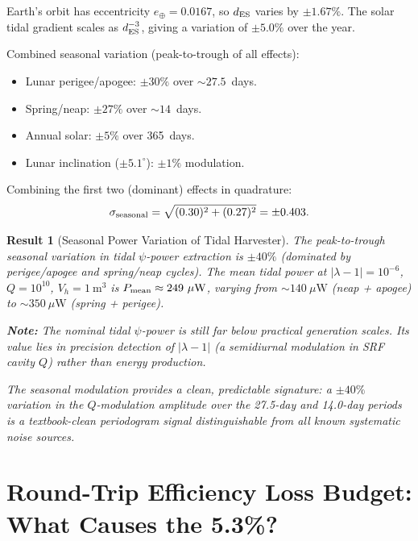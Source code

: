 \documentclass[aps,prd,twocolumn,superscriptaddress]{revtex4-2}
\newcommand{\lam}{|\lambda-1|}
\newtheorem{result}{Result}
\begin{document}
Earth's orbit has eccentricity $e_\oplus = 0.0167$, so $d_{\rm ES}$
varies by $\pm 1.67\%$.  The solar tidal gradient scales as
$d_{\rm ES}^{-3}$, giving a variation of $\pm 5.0\%$ over the year.

Combined seasonal variation (peak-to-trough of all effects):
\begin{itemize}
\item Lunar perigee/apogee: $\pm 30\%$ over $\sim 27.5$~days.
\item Spring/neap: $\pm 27\%$ over $\sim 14$~days.
\item Annual solar: $\pm 5\%$ over 365~days.
\item Lunar inclination ($\pm 5.1^\circ$): $\pm 1\%$ modulation.
\end{itemize}

Combining the first two (dominant) effects in quadrature:
\begin{equation}
\sigma_{\rm seasonal} = \sqrt{(0.30)^2 + (0.27)^2} = \pm 0.403.
\end{equation}

\begin{result}[Seasonal Power Variation of Tidal Harvester]
The peak-to-trough seasonal variation in tidal $\psi$-power extraction
is $\pm 40\%$ (dominated by perigee/apogee and spring/neap cycles).
The mean tidal power at $\lam = 10^{-6}$, $Q = 10^{10}$, $V_h = 1~\mathrm{m^3}$
is $P_{\rm mean} \approx 249~\mu\mathrm{W}$, varying from
$\sim 140~\mu\mathrm{W}$ (neap + apogee) to $\sim 350~\mu\mathrm{W}$
(spring + perigee).

\textbf{Note:}  The nominal tidal $\psi$-power is still far below
practical generation scales.  Its value lies in precision detection
of $\lam$ (a semidiurnal modulation in SRF cavity $Q$) rather than
energy production.

The seasonal modulation provides a clean, predictable signature:
a $\pm 40\%$ variation in the $Q$-modulation amplitude over the
27.5-day and 14.0-day periods is a textbook-clean periodogram signal
distinguishable from all known systematic noise sources.
\end{result}

\section{Round-Trip Efficiency Loss Budget: What Causes the 5.3\%?}
\label{sec:losses}
\end{document}
